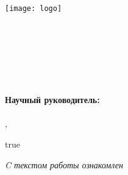 

\thispagestyle{titlepagestyle}
\begin{SingleSpace}
\begin{center}
\texttt{[image: logo]}\\
{\small
\MakeUppercase{\Univer}\\
\MakeUppercase{\Faculty}\\
\MakeUppercase{\Department}\\[4\baselineskip]
}
\Author\\
\textbf{
  \Title\\[2\baselineskip]
}
\MakeUppercase{\WorkType}\\[3\baselineskip]
\end{center}

\vspace*{2\baselineskip}

\noindent
\ifx\SciAdvisor\empty
%
\else
    \begin{minipage}{0.4\textwidth}
    \phantom{MMMM}
    \end{minipage}
    \begin{minipage}{0.58\textwidth}
            \SingleSpacing
            \textbf{Научный руководитель:}\\
            \Position
            \ifx\AcademicDegree\empty
                \\%
            \else
                , \AcademicDegree\\%
            \SciAdvisor
            \fi
    \end{minipage}

    \def\True{true}
    \ifx\EnableSign\True
    \vspace*{4\baselineskip}
    \begin{minipage}{0.4\textwidth}
    \phantom{MMMM}
    \end{minipage}
    \begin{minipage}{0.58\textwidth}
    {\small\textit{C текстом работы ознакомлен}}\\[2\baselineskip]
    \underline{\phantom{МММММММММММMM}} \SciAdvisorShort
    \end{minipage}
    \fi
\fi

\end{SingleSpace}
